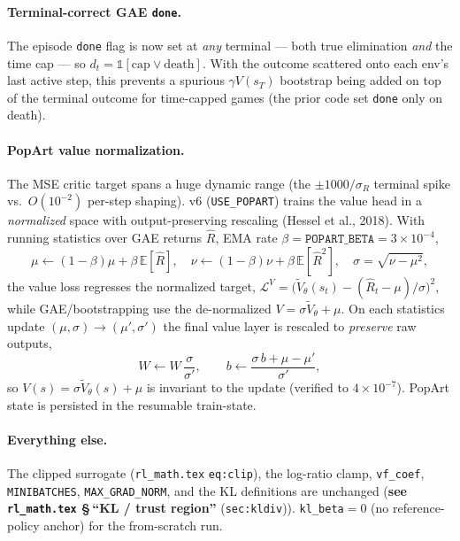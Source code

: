 \documentclass[11pt]{article}
\newcommand{\E}{\mathbb{E}}
\newcommand{\cd}[1]{\texttt{#1}}
\newcommand{\rlref}[2]{\textbf{see \texttt{rl\_math.tex} \S\,``#1''} (\texttt{#2})}
\begin{document}
\paragraph{Terminal-correct GAE \cd{done}.} The episode \cd{done} flag is now set at \emph{any} terminal
--- both true elimination \emph{and} the time cap --- so $d_t=\mathbb 1[\text{cap}\vee\text{death}]$. With
the outcome scattered onto each env's last active step, this prevents a spurious $\gamma V(s_T)$ bootstrap
being added on top of the terminal outcome for time-capped games (the prior code set \cd{done} only on
death).

\paragraph{PopArt value normalization.}\label{v6:popart} The MSE critic target spans a huge dynamic range
(the $\pm1000/\sigma_R$ terminal spike vs.\ $O(10^{-2})$ per-step shaping). v6 (\cd{USE\_POPART}) trains
the value head in a \emph{normalized} space with output-preserving rescaling (Hessel et al., 2018). With
running statistics over GAE returns $\hat R$, EMA rate $\beta=\cd{POPART\_BETA}=3\!\times\!10^{-4}$,
\begin{equation}
\mu\leftarrow(1{-}\beta)\mu+\beta\,\E[\hat R],\quad
\nu\leftarrow(1{-}\beta)\nu+\beta\,\E[\hat R^2],\quad
\sigma=\sqrt{\nu-\mu^2},
\end{equation}
the value loss regresses the normalized target,
$\mathcal L^{V}=\big(\tilde V_\theta(s_t)-(\hat R_t-\mu)/\sigma\big)^2$, while GAE/bootstrapping use the
de-normalized $V=\sigma\tilde V_\theta+\mu$. On each statistics update $(\mu,\sigma)\!\to\!(\mu',\sigma')$
the final value layer is rescaled to \emph{preserve} raw outputs,
\begin{equation}
W\leftarrow W\,\frac{\sigma}{\sigma'},\qquad b\leftarrow\frac{\sigma\,b+\mu-\mu'}{\sigma'},
\end{equation}
so $V(s)=\sigma\tilde V_\theta(s)+\mu$ is invariant to the update (verified to $4\times10^{-7}$). PopArt
state is persisted in the resumable train-state.

\paragraph{Everything else.} The clipped surrogate (\texttt{rl\_math.tex} \texttt{eq:clip}), the log-ratio clamp, \cd{vf\_coef},
\cd{MINIBATCHES}, \cd{MAX\_GRAD\_NORM}, and the KL definitions are unchanged
(\rlref{KL / trust region}{sec:kldiv}). \cd{kl\_beta}$=0$ (no reference-policy anchor) for the from-scratch run.
\end{document}
